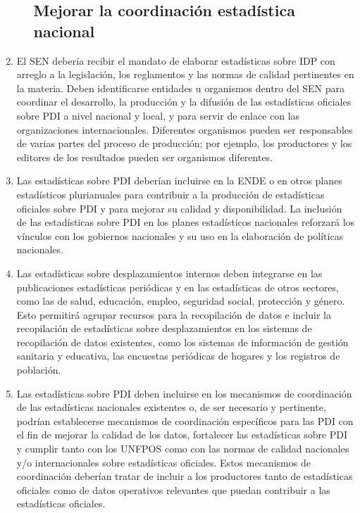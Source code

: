 \documentclass[
]{book}
\begin{document}
\begin{enumerate}
\begin{enumerate}
{    \subsection{Mejorar la coordinación estadística nacional}\label{mejorar-la-coordinaciuxf3n-estaduxedstica-nacional}}
  \end{enumerate}
\item
  El SEN debería recibir el mandato de elaborar estadísticas sobre IDP con arreglo a la legislación, los reglamentos y las normas de calidad pertinentes en la materia. Deben identificarse entidades u organismos dentro del SEN para coordinar el desarrollo, la producción y la difusión de las estadísticas oficiales sobre PDI a nivel nacional y local, y para servir de enlace con las organizaciones internacionales. Diferentes organismos pueden ser responsables de varias partes del proceso de producción; por ejemplo, los productores y los editores de los resultados pueden ser organismos diferentes.
\item
  Las estadísticas sobre PDI deberían incluirse en la ENDE o en otros planes estadísticos plurianuales para contribuir a la producción de estadísticas oficiales sobre PDI y para mejorar su calidad y disponibilidad. La inclusión de las estadísticas sobre PDI en los planes estadísticos nacionales reforzará los vínculos con los gobiernos nacionales y su uso en la elaboración de políticas nacionales.
\item
  Las estadísticas sobre desplazamientos internos deben integrarse en las publicaciones estadísticas periódicas y en las estadísticas de otros sectores, como las de salud, educación, empleo, seguridad social, protección y género. Esto permitirá agrupar recursos para la recopilación de datos e incluir la recopilación de estadísticas sobre desplazamientos en los sistemas de recopilación de datos existentes, como los sistemas de información de gestión sanitaria y educativa, las encuestas periódicas de hogares y los registros de población.
\item
  Las estadísticas sobre PDI deben incluirse en los mecanismos de coordinación de las estadísticas nacionales existentes o, de ser necesario y pertinente, podrían establecerse mecanismos de coordinación específicos para las PDI con el fin de mejorar la calidad de los datos, fortalecer las estadísticas sobre PDI y cumplir tanto con los UNFPOS como con las normas de calidad nacionales y/o internacionales sobre estadísticas oficiales. Estos mecanismos de coordinación deberían tratar de incluir a los productores tanto de estadísticas oficiales como de datos operativos relevantes que puedan contribuir a las estadísticas oficiales.

\end{enumerate}
\end{document}
